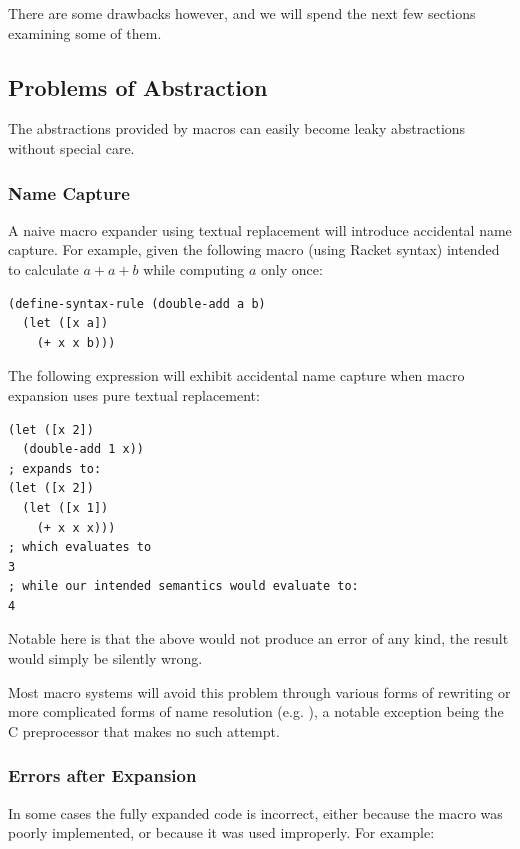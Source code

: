 \documentclass{kththesis}
\begin{document}
There are some drawbacks however, and we will spend the next few sections examining some of them.

\subsection{Problems of Abstraction} \label{sec:problem-abstraction}

The abstractions provided by macros can easily become leaky abstractions without special care.

\subsubsection{Name Capture}

A naive macro expander using textual replacement will introduce accidental name capture. For example, given the following macro (using Racket syntax) intended to calculate $a + a + b$ while computing $a$ only once:

\begin{verbatim}
(define-syntax-rule (double-add a b)
  (let ([x a])
    (+ x x b)))
\end{verbatim}

The following expression will exhibit accidental name capture when macro expansion uses pure textual replacement:

\begin{verbatim}
(let ([x 2])
  (double-add 1 x))
; expands to:
(let ([x 2])
  (let ([x 1])
    (+ x x x)))
; which evaluates to
3
; while our intended semantics would evaluate to:
4
\end{verbatim}

Notable here is that the above would not produce an error of any kind, the result would simply be silently wrong.

Most macro systems will avoid this problem through various forms of rewriting or more complicated forms of name resolution (e.g. \cite{FLATT2012Macros-that-Wor,Flatt2016Binding-As-Sets}), a notable exception being the C preprocessor that makes no such attempt.

\subsubsection{Errors after Expansion}

In some cases the fully expanded code is incorrect, either because the macro was poorly implemented, or because it was used improperly. For example:
\end{document}
